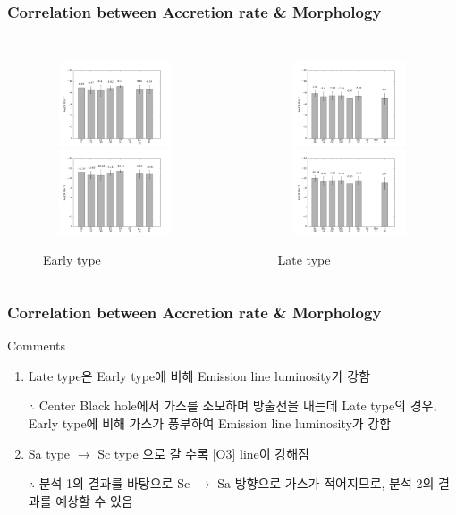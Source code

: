 \documentclass[xcolor={dvipsnames,table}]{beamer}
\newcommand\SM{\fontsize{8}{7.2}\selectfont}
\newcommand\SSM{\fontsize{7}{7.2}\selectfont}
\begin{document}
\begin{frame}
 \frametitle{Correlation between Accretion rate \& Morphology}
 \SSM
  \begin{columns}
   \begin{figure}
    \centering
    \includegraphics[width=5cm, height=2.5cm]{accearly.png}
    \hfill
    \includegraphics[width=5cm, height=2.5cm]{accearly2.png}
    \caption{Early type}
   \end{figure}
   \begin{figure}
    \centering
    \includegraphics[width=5cm, height=2.5cm]{acclate.png}
    \hfill
    \includegraphics[width=5cm, height=2.5cm]{acclat2.png}
    \caption{Late type}
   \end{figure}
  \end{columns}
\vspace{0.2cm}
\end{frame}

\begin{frame}
 \frametitle{Correlation between Accretion rate \& Morphology}
 \SM
 \begin{block}{Comments}
  \begin{enumerate}
   \item Late type은 Early type에 비해 Emission line luminosity가 강함
   \vspace{0.2cm}
   
   $\therefore$ Center Black hole에서 가스를 소모하며 방출선을 내는데 Late type의 경우, 
   Early type에 비해 가스가 풍부하여 Emission line luminosity가 강함
   
   \item Sa type $\rightarrow$ Sc type 으로 갈 수록 [O3] line이 강해짐
   \vspace{0.2cm}
   
   $\therefore$ 분석 1의 결과를 바탕으로 Sc $\rightarrow$ Sa 방향으로 가스가 적어지므로, 분석 2의 결과를 예상할 수 있음
  \end{enumerate}
 \end{block}
\end{frame}
\end{document}
